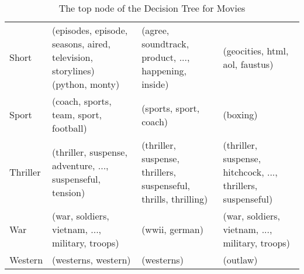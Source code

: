 \begin{landscape}
\begin{table}[]
\begin{tabular}{lp{7cm}p{7cm}p{7cm}}
			Short       & (episodes, episode, seasons, aired, television, storylines)  (python, monty) & (agree, soundtrack, product, ..., happening, inside)               & (geocities, html, aol, faustus)                                          \\
			Sport       & (coach, sports, team, sport, football)                                       & (sports, sport, coach)                                             & (boxing)                                                                 \\
			Thriller    & (thriller, suspense, adventure, ..., suspenseful, tension)                   & (thriller, suspense, thrillers, suspenseful, thrills, thrilling)   & (thriller, suspense, hitchcock, ..., thrillers, suspenseful)             \\
			War         & (war, soldiers, vietnam, ..., military, troops)                              & (wwii, german)                                                     & (war, soldiers, vietnam, ..., military, troops)                          \\
			Western     & (westerns, western)                                                          & (westerns)                                                         & (outlaw)                                                                
		\end{tabular}\caption{The top node of the Decision Tree for Movies}
	\end{table}
\end{landscape}

 



